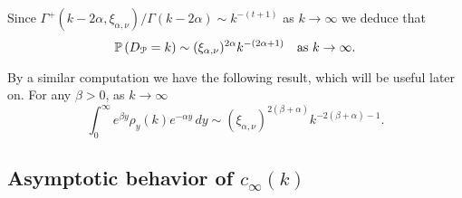 Since $\Gamma^{+}(k-2\alpha, \xi_{\alpha,\nu})/\Gamma(k - 2\alpha) \sim k^{-(t+1)}$ as $k \to \infty$  we deduce that
\begin{equation}\label{eq:degree_distribution_P_asymptotics}
	\mathbb{P}\left(D_{{\mathcal P}} = k\right) \sim (\xi_{\alpha,\nu})^{2\alpha} k^{-(2\alpha + 1)}
	\quad \text{as } k \to \infty.
\end{equation}

By a similar computation we have the following result, which will be useful later on. For any $\beta > 0$, as $k \to \infty$
\begin{equation}\label{eq:general_integral_rho_y_k}
	\int_0^\infty e^{\beta y} \rho_y(k) e^{-\alpha y} \, dy
    \sim \left(\xi_{\alpha,\nu}\right)^{2(\beta + \alpha)} k^{-2(\beta + \alpha)-1}.
\end{equation}

\subsection{Asymptotic behavior of $c_\infty(k)$}\label{ssec:asymptotics_local_clustering_P}

%

